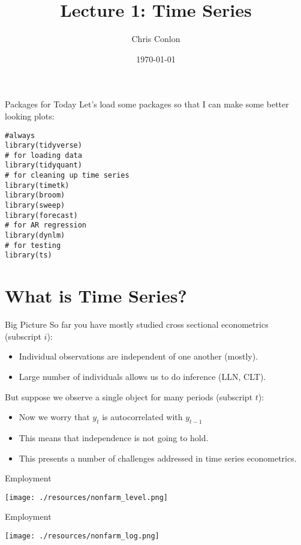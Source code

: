 \documentclass[aspectratio=169]{beamer}
\title{Lecture 1: Time Series}
\author{Chris Conlon }
\institute{NYU Stern }
\date{\today}
\begin{document}
\maketitle

\begin{frame}[fragile]{Packages for Today}
Let's load some packages so that I can make some better looking plots:\\
\begin{verbatim}
#always
library(tidyverse)
# for loading data
library(tidyquant)
# for cleaning up time series
library(timetk)
library(broom)
library(sweep)
library(forecast)
# for AR regression
library(dynlm)
# for testing
library(ts)
\end{verbatim}
\end{frame}

\section{What is Time Series?}


\begin{frame}{Big Picture}
So far you have mostly studied \alert{cross sectional econometrics} (subscript $i$):
\begin{itemize}
\item Individual observations are \alert{independent} of one another (mostly).
\item Large number of individuals allows us to do inference (LLN, CLT).
\end{itemize}
\vspace{1cm}
But suppose we observe a single object for many periods (subscript $t$):
\begin{itemize}
\item Now we worry that $y_{t}$ is \alert{autocorrelated} with $y_{t-1}$
\item This means that \alert{independence} is not going to hold.
\item This presents a number of challenges addressed in time series econometrics.
\end{itemize}
\end{frame}

\begin{frame}{Employment}
\begin{center}
\texttt{[image: ./resources/nonfarm\_level.png]}
\end{center}
\end{frame}

\begin{frame}{Employment}
\begin{center}
\texttt{[image: ./resources/nonfarm\_log.png]}
\end{center}
\end{frame}
\end{document}

